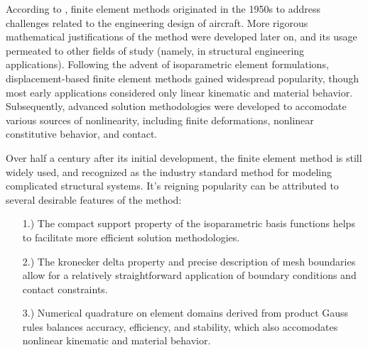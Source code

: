 	According to \cite{Felippa:04}, finite element methods originated in the 1950s to address challenges related to the engineering design of aircraft. More rigorous mathematical justifications of the method were developed later on, and its usage permeated to other fields of study (namely, in structural engineering applications). Following the advent of isoparametric element formulations, displacement-based finite element methods gained widespread popularity, though most early applications considered only linear kinematic and material behavior.
	Subsequently, advanced solution methodologies were developed to accomodate various sources of nonlinearity, including finite deformations, nonlinear constitutive behavior, and contact.

	Over half a century after its initial development, the finite element method is still widely used, and recognized as the industry standard method for modeling complicated structural systems. It's reigning popularity can be attributed to several desirable features of the method:
	\begin{itemize}
		\item[1.)] The compact support property of the isoparametric basis functions helps to facilitate more efficient solution methodologies.
		\item[2.)] The kronecker delta property and precise description of mesh boundaries allow for a relatively straightforward application of boundary conditions and contact constraints.
		\item[3.)] Numerical quadrature on element domains derived from product Gauss rules balances accuracy, efficiency, and stability, which also accomodates nonlinear kinematic and material behavior.
	\end{itemize}	
	
